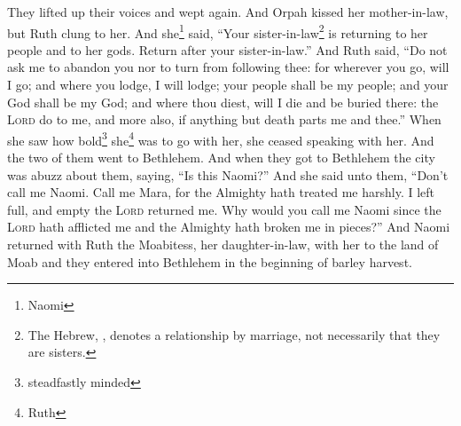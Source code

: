 \begin{enumerate}
     They lifted up their voices and wept again. And Orpah kissed her mother-in-law, but Ruth clung to her.%
     And she\footnote{Naomi} said, ``Your sister-in-law\footnote{The Hebrew, , denotes a relationship by marriage, not necessarily that they are sisters.} is returning to her people and to her gods. Return after your sister-in-law.''%
     And Ruth said, ``Do not ask me to abandon you nor to turn from following thee: for wherever you go, will I go; and where you lodge, I will lodge; your people shall be my people; and your God shall be my God;%
     and where thou diest, will I die and be buried there: the \textsc{Lord} do to me, and more also, if anything but death parts me and thee.''%
     When she saw how bold\footnote{steadfastly minded} she\footnote{Ruth} was to go with her, she ceased speaking with her.%
     And the two of them went to Bethlehem. And when they got to Bethlehem the city was abuzz about them, saying, ``Is this Naomi?''%
     And she said unto them, ``Don't call me Naomi. Call me Mara, for the Almighty hath treated me harshly.%
     I left full, and empty the \textsc{Lord} returned me. Why would you call me Naomi since the \textsc{Lord} hath afflicted me and the Almighty hath broken me in pieces?''%
     And Naomi returned with Ruth the Moabitess, her daughter-in-law, with her to the land of Moab and they entered into Bethlehem in the beginning of barley harvest.%
\end{enumerate}
